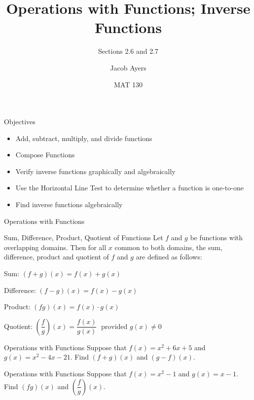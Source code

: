 \documentclass{beamer}
\title[2.6 and 2.7]{Operations with Functions; Inverse Functions}
\subtitle{Sections 2.6 and 2.7}
\author{Jacob Ayers}
\institute{Lesson \#10}
\date{MAT 130}
\newcommand{\fp}[1]{\left({#1}\right)} %
\begin{document}
\begin{frame}
\titlepage
\end{frame}

\begin{frame}[t]{Objectives}
\begin{itemize}
	\item Add, subtract, multiply, and divide functions
	\item Compose Functions
	\item Verify inverse functions graphically and algebraically
	\item Use the Horizontal Line Test to determine whether a function is one-to-one
	\item Find inverse functions algebraically
\end{itemize}

\end{frame}\begin{frame}[t]{Operations with Functions}
\begin{block}{Sum, Difference, Product, Quotient of Functions}
Let $f$ and $g$ be functions with overlapping domains. Then for all $x$ common to both domains, the sum, difference, product and quotient of $f$ and $g$ are defined as follows:

Sum: $(f + g)(x) = f(x) + g(x)$ \vspace{12pt}

Difference: $(f - g)(x) = f(x) - g(x)$ \vspace{12pt}

Product: $(fg)(x) = f(x) \cdot g(x)$ \vspace{12pt}

Quotient: $\fp{\dfrac{f}{g}}(x) = \dfrac{f(x)}{g(x)} \; \text{ provided } g(x) \neq 0$
\end{block}
\end{frame}

\begin{frame}[t]{Operations with Functions}
Suppose that $f(x) = x^2 + 6x + 5$ and $g(x) = x^2 - 4x - 21$. Find $(f + g)(x)$ and $(g - f)(x)$.
\end{frame}

\begin{frame}[t]{Operations with Functions}
Suppose that $f(x) = x^2 - 1$ and $g(x) = x - 1$. Find $(fg)(x)$ and $\fp{\dfrac{f}{g}}(x)$.
\end{frame}
\end{document}
